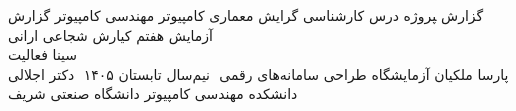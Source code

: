 ‫
‫%
‫%
‫%
‫
‫\newcommand{\ProjectReportType}
‫{ گزارش ‍‍‍‍‍پروژه درس} 
‫\newcommand{\StudentDegree}
‫{کارشناسی گرایش معماری کامپیوتر}  %
‫\newcommand{\CourseMajor}
‫{مهندسی کامپیوتر}  %
‫\newcommand{\CourseReportTitle}
‫{گزارش آزمایش هفتم}
‫\newcommand{\GroupeMembers}
‫{کیارش شجاعی ارانی \\ سینا فعالیت \\ پارسا ملکیان}
‫\newcommand{\CourseName}
‫{آزمایشگاه طراحی سامانه‌های رقمی}
‫
‫\newcommand{\courseSemester}
‫{نیم‌سال تابستان ۱۴۰۵}
‫
‫\newcommand{\CourseProfessor}
‫{دکتر اجلالی}
‫\newcommand{\Department}
‫{دانشکده مهندسی کامپیوتر}
‫\newcommand{\University}
‫{دانشگاه صنعتی شریف}
‫
‫%
‫%
‫%
‫
‫